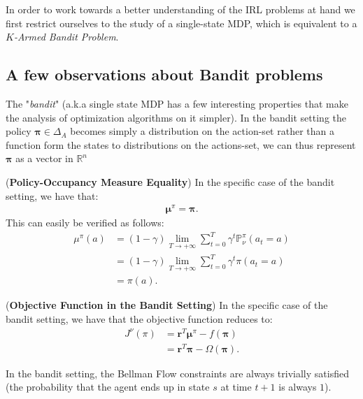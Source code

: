 In order to work towards a better understanding of the IRL problems at hand we first restrict ourselves to the study of a single-state MDP, which is equivalent to a \textit{$K$-Armed Bandit Problem}.

\subsection{A few observations about Bandit problems}

The "\textit{bandit}" (a.k.a single state MDP has a few interesting properties that make the analysis of optimization algorithms on it simpler). In the bandit setting the policy $\bm{\pi} \in \Delta_A$ becomes simply a distribution on the action-set rather than a function form the states to distributions on the actions-set, we can thus represent $\bm{\pi}$ as a vector in $\mathbb{R}^n$

\begin{observation}
    (\textbf{Policy-Occupancy Measure Equality}) In the specific case of the bandit setting, we have that:
    \begin{align*}
        \bm{\mu}^\pi = \bm{\pi}.
    \end{align*}
    This can easily be verified as follows:
    \begin{align*}
        \mu^\pi(a) &= (1-\gamma) \lim_{T \rightarrow + \infty} \sum_{t=0}^T \gamma^t \mathbb{P}_\nu^\pi(a_t=a) 
        \\
        &= (1-\gamma) \lim_{T \rightarrow + \infty} \sum_{t=0}^T \gamma^t \pi(a_t=a) \\
        &= \pi(a).
    \end{align*}
\end{observation}

\begin{observation}
    (\textbf{Objective Function in the Bandit Setting}) In the specific case of the bandit setting, we have that the objective function reduces to:
    \begin{align*}
        J^\nu(\pi) &= \bm{r}^T \bm{\mu}^\pi -f(\bm{\pi})\\
        &= \bm{r}^T \bm{\pi} - \Omega(\bm{\pi}).
    \end{align*}
\end{observation}

\begin{observation}
    In the bandit setting, the Bellman Flow constraints are always trivially satisfied (the probability that the agent ends up in state $s$ at time $t+1$ is always $1$). 
\end{observation}

